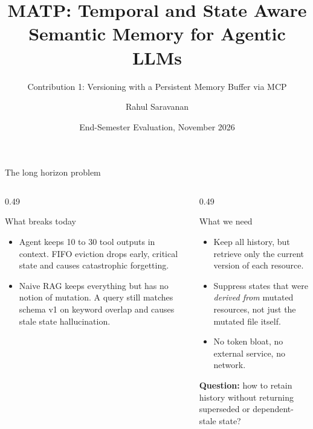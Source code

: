 \documentclass[aspectratio=169,10pt]{beamer}
\title[MATP Endsem]{MATP: Temporal and State Aware Semantic Memory for Agentic LLMs}
\subtitle{Contribution 1: Versioning with a Persistent Memory Buffer via MCP}
\author[Rahul Saravanan]{Rahul Saravanan}
\institute[NITK]{Department of Information Technology \\ National Institute of Technology Karnataka, Surathkal}
\date{End-Semester Evaluation, November 2026}
\begin{document}
\begin{frame}
  \titlepage
\end{frame}

\begin{frame}{The long horizon problem}
  \begin{columns}[T,onlytextwidth]
    \begin{column}{0.49\textwidth}
      \begin{block}{What breaks today}
        \begin{itemize}
          \item Agent keeps 10 to 30 tool outputs in context. FIFO eviction drops early, critical state and causes catastrophic forgetting.
          \item Naive RAG keeps everything but has no notion of mutation. A query still matches schema v1 on keyword overlap and causes stale state hallucination.
        \end{itemize}
      \end{block}
    \end{column}
    \begin{column}{0.49\textwidth}
      \begin{block}{What we need}
        \begin{itemize}
          \item Keep all history, but retrieve only the current version of each resource.
          \item Suppress states that were \emph{derived from} mutated resources, not just the mutated file itself.
          \item No token bloat, no external service, no network.
        \end{itemize}
      \end{block}
      \vspace{0.6em}
      {\small \textbf{Question:} how to retain history without returning superseded or dependent-stale state?}
    \end{column}
  \end{columns}
\end{frame}
\end{document}
